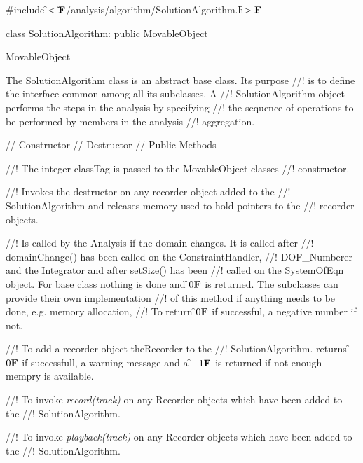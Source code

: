 
\indent \#include \f$<\tilde{ }{\bf F}$/analysis/algorithm/SolutionAlgorithm.h\f$>{\bf F}$

\indent class SolutionAlgorithm: public MovableObject

\indent MovableObject
\indent{}

\indent The SolutionAlgorithm class is an abstract base class. Its purpose
//! is to define the interface common among all its subclasses. A
//! SolutionAlgorithm object performs the steps in the analysis by specifying
//! the sequence of operations to be performed by members in the analysis
//! aggregation.


\indent // Constructor 
\indent // Destructor
\indent // Public Methods


//! The integer \p classTag is passed to the MovableObject classes
//! constructor.

//! Invokes the destructor on any recorder object added to the
//! SolutionAlgorithm and releases memory used to hold pointers to the
//! recorder objects.


//! Is called by the Analysis if the domain changes. It is called after
//! domainChange() has been called on the ConstraintHandler,
//! DOF\_Numberer and the Integrator and after setSize() has been
//! called on the SystemOfEqn object. For base class nothing is done and
\f$0{\bf F}$ is returned. The subclasses can provide their own implementation
//! of this method if anything needs to be done, e.g. memory allocation,
//! To return \f$0{\bf F}$ if successful, a negative number if not.


//! To add a recorder object \p theRecorder to the
//! SolutionAlgorithm. returns \f$0{\bf F}$ if successfull, a warning message and a
\f$-1{\bf F}$ is returned if not enough mempry is available.

//! To invoke {\em record(track)} on any Recorder objects which have been added to the
//! SolutionAlgorithm.

//! To invoke {\em playback(track)} on any Recorder objects which have been added to the
//! SolutionAlgorithm.






